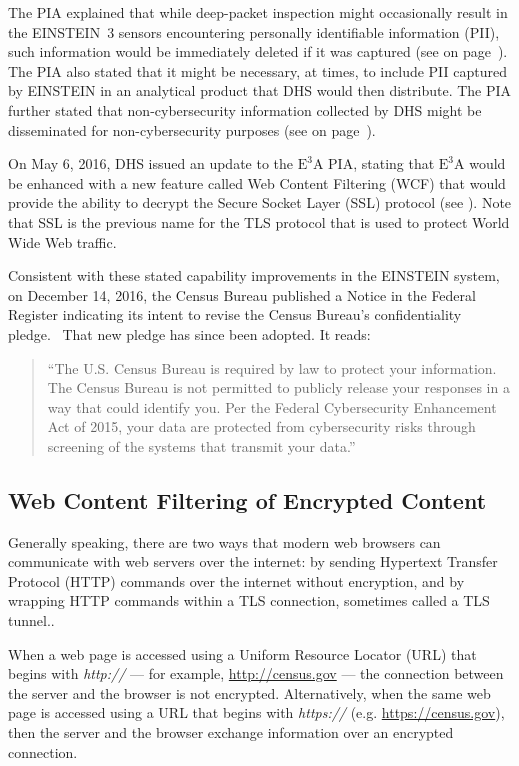 \documentclass[fleqn,12pt]{wlscirep}
\newcommand{\ETA}{$\textrm{E}^\textrm{3}\textrm{A}$\xspace}
\begin{document}
The PIA explained that while deep-packet inspection might occasionally
result in the EINSTEIN~3 sensors encountering personally identifiable
information (PII), such information would be immediately deleted if it
was captured (see  on page~\pageref{excerpt1}). The PIA also stated that it
might be necessary, at times, to include PII captured by EINSTEIN in
an analytical product that DHS would then distribute. The PIA further
stated that non-cybersecurity information collected by DHS might be
disseminated for non-cybersecurity purposes (see  on
page~\pageref{excerpt3}).

On May 6, 2016, DHS issued an update to the \ETA PIA, stating that \ETA
would be enhanced with a new feature called Web Content
Filtering (WCF) that would provide the ability to decrypt
the Secure Socket Layer (SSL) protocol (see ). Note
that SSL
is the previous name for the TLS protocol that is
used to protect World Wide Web traffic.

Consistent with these stated capability improvements in the EINSTEIN
system, on December 14, 2016, the Census Bureau published a Notice in
the Federal Register indicating its intent to revise the
Census Bureau's confidentiality
pledge.~\cite{federal-register-2016-12-14} That new pledge has since
been adopted. It reads:

\begin{quote}
  ``The U.S. Census Bureau is required by law to protect your
  information. The Census Bureau is not permitted to publicly release
  your responses in a way that could identify you. Per the Federal
  Cybersecurity Enhancement Act of 2015, your data are protected from
  cybersecurity risks through screening of the systems that transmit
  your data.''~\cite{federal-register-2016-12-14,pledge}
\end{quote}

\subsection{Web Content Filtering of Encrypted Content}

Generally speaking, there are two ways that modern web browsers can
communicate with web servers over the internet: by sending Hypertext
Transfer Protocol (HTTP) commands over the internet without
encryption, and by wrapping HTTP commands within a TLS connection,
sometimes called a TLS tunnel..

When a web page is accessed using a Uniform Resource Locator
(URL) that begins with \emph{http://} --- for example,
\url{http://census.gov} --- the connection between the server and the
browser is not encrypted. Alternatively, when the same web page is
accessed using a URL that begins with \emph{https://}
(e.g. \url{https://census.gov}), then the server and the browser
exchange information over an encrypted connection.
\end{document}

